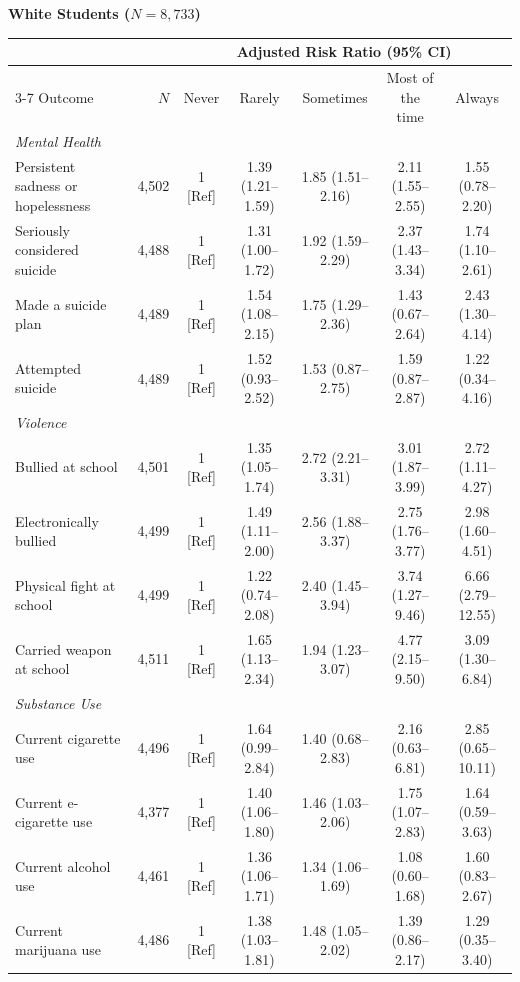 \documentclass[12pt]{article}
\begin{document}
\begin{landscape}
\nobreak\noindent\textbf{White Students ($N = 8,733$)}
\nopagebreak\par\nopagebreak\vspace{1pt}\nopagebreak
\nobreak\noindent\begin{tabular}{l r ccccc}
\toprule
 & & \multicolumn{5}{c}{Adjusted Risk Ratio (95\% CI)} \\
\cmidrule(lr){3-7}
Outcome & $N$ & Never & Rarely & Sometimes & Most of the time & Always \\
\midrule
\textit{Mental Health} \\
\quad Persistent sadness or hopelessness & 4,502 & 1 [Ref] & 1.39 (1.21--1.59) & 1.85 (1.51--2.16) & 2.11 (1.55--2.55) & 1.55 (0.78--2.20) \\
\quad Seriously considered suicide & 4,488 & 1 [Ref] & 1.31 (1.00--1.72) & 1.92 (1.59--2.29) & 2.37 (1.43--3.34) & 1.74 (1.10--2.61) \\
\quad Made a suicide plan & 4,489 & 1 [Ref] & 1.54 (1.08--2.15) & 1.75 (1.29--2.36) & 1.43 (0.67--2.64) & 2.43 (1.30--4.14) \\
\quad Attempted suicide & 4,489 & 1 [Ref] & 1.52 (0.93--2.52) & 1.53 (0.87--2.75) & 1.59 (0.87--2.87) & 1.22 (0.34--4.16) \\
\addlinespace[4pt]
\textit{Violence} \\
\quad Bullied at school & 4,501 & 1 [Ref] & 1.35 (1.05--1.74) & 2.72 (2.21--3.31) & 3.01 (1.87--3.99) & 2.72 (1.11--4.27) \\
\quad Electronically bullied & 4,499 & 1 [Ref] & 1.49 (1.11--2.00) & 2.56 (1.88--3.37) & 2.75 (1.76--3.77) & 2.98 (1.60--4.51) \\
\quad Physical fight at school & 4,499 & 1 [Ref] & 1.22 (0.74--2.08) & 2.40 (1.45--3.94) & 3.74 (1.27--9.46) & 6.66 (2.79--12.55) \\
\quad Carried weapon at school & 4,511 & 1 [Ref] & 1.65 (1.13--2.34) & 1.94 (1.23--3.07) & 4.77 (2.15--9.50) & 3.09 (1.30--6.84) \\
\addlinespace[4pt]
\textit{Substance Use} \\
\quad Current cigarette use & 4,496 & 1 [Ref] & 1.64 (0.99--2.84) & 1.40 (0.68--2.83) & 2.16 (0.63--6.81) & 2.85 (0.65--10.11) \\
\quad Current e-cigarette use & 4,377 & 1 [Ref] & 1.40 (1.06--1.80) & 1.46 (1.03--2.06) & 1.75 (1.07--2.83) & 1.64 (0.59--3.63) \\
\quad Current alcohol use & 4,461 & 1 [Ref] & 1.36 (1.06--1.71) & 1.34 (1.06--1.69) & 1.08 (0.60--1.68) & 1.60 (0.83--2.67) \\
\quad Current marijuana use & 4,486 & 1 [Ref] & 1.38 (1.03--1.81) & 1.48 (1.05--2.02) & 1.39 (0.86--2.17) & 1.29 (0.35--3.40) \\
\bottomrule
\end{tabular}\par\vspace{8pt}


\end{landscape}
\end{document}
